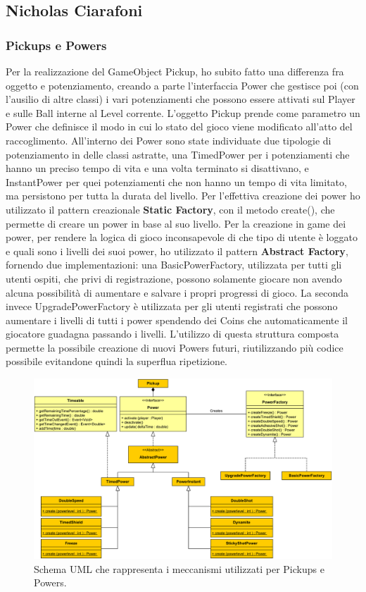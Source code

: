 \documentclass[a4paper,12pt]{report}
\begin{document}
\subsection*{Nicholas Ciarafoni}

\subsubsection*{Pickups e Powers}

Per la realizzazione del GameObject Pickup, ho subito fatto una differenza fra oggetto e potenziamento, creando a parte l'interfaccia Power che gestisce poi (con l'ausilio di altre classi) i vari potenziamenti che possono essere attivati sul Player e sulle Ball interne al Level corrente.
L'oggetto Pickup prende come parametro un Power che definisce il modo in cui lo stato del gioco viene modificato all'atto del raccoglimento.
All'interno dei Power sono state individuate due tipologie di potenziamento in delle classi astratte, una TimedPower per i potenziamenti che hanno un preciso tempo di vita e una volta terminato si disattivano, e InstantPower per quei potenziamenti che non hanno un tempo di vita limitato, ma persistono per tutta la durata del livello.
Per l'effettiva creazione dei power ho utilizzato il pattern creazionale \textbf{Static Factory}, con il metodo create(), che permette di creare un power in base al suo livello.
Per la creazione in game dei power, per rendere la logica di gioco inconsapevole di che tipo di utente è loggato e quali sono i livelli dei suoi power, ho utilizzato il pattern \textbf{Abstract Factory}, fornendo due implementazioni: una BasicPowerFactory, utilizzata per tutti gli utenti ospiti, che privi di registrazione, possono solamente giocare non avendo alcuna possibilità di aumentare e salvare i propri progressi di gioco.
La seconda invece UpgradePowerFactory è utilizzata per gli utenti registrati che possono aumentare i livelli di tutti i power spendendo dei Coins che automaticamente il giocatore guadagna passando i livelli.
L'utilizzo di questa struttura composta permette la possibile creazione di nuovi Powers futuri, riutilizzando più codice possibile evitandone quindi la superflua ripetizione.

\begin{figure}[H]
\includegraphics[width=\linewidth]{img/powers}
\caption{Schema UML che rappresenta i meccanismi utilizzati per Pickups e Powers.}
\label{img:powers}
\end{figure}
\end{document}
